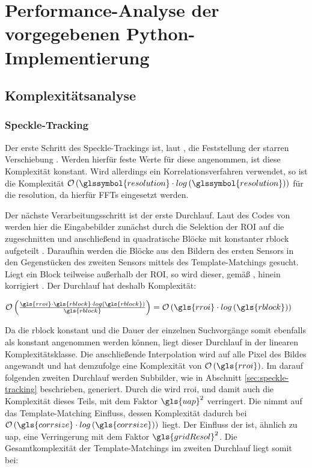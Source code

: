 \chapter{Performance-Analyse der vorgegebenen Python-Implementierung}

\section{Komplexitätsanalyse}

\subsection{Speckle-Tracking}

Der erste Schritt des Speckle-Trackings ist, laut \citeauthor{Ber13, Coj17}, die Feststellung der starren Verschiebung \cite{Ber13, Coj17}. Werden hierfür feste Werte für diese angenommen, ist diese Komplexität konstant. Wird allerdings ein Korrelationsverfahren verwendet, so ist die Komplexität $\mathcal{O}\left(\glssymbol{resolution} \cdot log\left(\glssymbol{resolution}\right)\right)$ für die \gls{resolution}, da hierfür \glspl{FFT} eingesetzt werden. 

Der nächste Verarbeitungsschritt ist der erste Durchlauf. Laut des Codes von \citeauthor{Coj17} werden hier die Eingabebilder zunächst durch die Selektion der \gls{ROI} auf die   zugeschnitten und anschließend in quadratische Blöcke mit konstanter \gls{rblock} aufgeteilt \cite{Coj17}. Daraufhin werden die Blöcke aus den Bildern des ersten Sensors in den Gegenstücken des zweiten Sensors mittels des Template-Matchings gesucht. Liegt ein Block teilweise außerhalb der \gls{ROI}, so wird dieser, gemäß \citeauthor{Coj17}, hinein korrigiert \cite{Coj17}. Der Durchlauf hat deshalb Komplexität: 

\begin{center}
	$\mathcal{O}\left(\frac{\gls{rroi} \cdot \gls{rblock} \cdot log\left(\gls{rblock}\right)}{\gls{rblock}}\right) = \mathcal{O}\left(\gls{rroi} \cdot log\left(\gls{rblock}\right)\right)$
\end{center}

Da die \gls{rblock} konstant und die Dauer der einzelnen Suchvorgänge somit ebenfalls als konstant angenommen werden können, liegt dieser Durchlauf in der linearen Komplexitätsklasse. Die anschließende Interpolation wird auf alle Pixel des Bildes angewandt und hat demzufolge eine Komplexität von $\mathcal{O}\left(\gls{rroi}\right)$. Im darauf folgenden zweiten Durchlauf werden Subbilder, wie in Abschnitt \ref{sec:speckle-tracking} beschrieben, generiert. Durch die   wird \gls{rroi}, und damit auch die Komplexität dieses Teils, mit dem Faktor $\gls{uap}^2$ verringert. Die   nimmt auf das Template-Matching Einfluss, dessen Komplexität dadurch bei $\mathcal{O}\left(\gls{corrsize} \cdot log\left(\gls{corrsize}\right)\right)$ liegt. Der Einfluss der   ist, ähnlich zu \gls{uap}, eine Verringerung mit dem Faktor $\gls{gridResol}^2$. Die Gesamtkomplexität der Template-Matchings im zweiten Durchlauf liegt somit bei:

